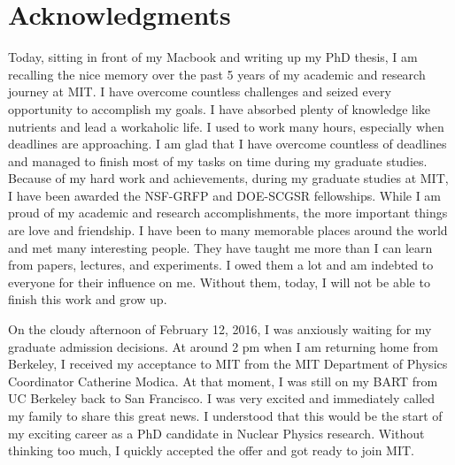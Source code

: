 \cleardoublepage
\setcounter{savepage}{\thepage}
\begin{abstractpage}

\end{abstractpage}

% 

\cleardoublepage

\section*{Acknowledgments}


Today, sitting in front of my Macbook and writing up my PhD thesis, I am recalling the nice memory over the past 5 years of my academic and research journey at MIT. I have overcome countless challenges and seized every opportunity to accomplish my goals. I have absorbed plenty of knowledge like nutrients and lead a workaholic life. I used to work many hours, especially when deadlines are approaching. I am glad that I have overcome countless of deadlines and managed to finish most of my tasks on time during my graduate studies. Because of my hard work and achievements, during my graduate studies at MIT, I have been awarded the NSF-GRFP and DOE-SCGSR fellowships. While I am proud of my academic and research accomplishments, the more important things are love and friendship. I have been to many memorable places around the world and met many interesting people. They have taught me more than I can learn from papers, lectures, and experiments. I owed them a lot and am indebted to everyone for their influence on me. Without them, today, I will not be able to finish this work and grow up.

On the cloudy afternoon of February 12, 2016, I was anxiously waiting for my graduate admission decisions. At around 2 pm when I am returning home from Berkeley, I received my acceptance to MIT from the MIT Department of Physics Coordinator Catherine Modica. At that moment, I was still on my BART from UC Berkeley back to San Francisco. I was very excited and immediately called my family to share this great news. I understood that this would be the start of my exciting career as a PhD candidate in Nuclear Physics research. Without thinking too much, I quickly accepted the offer and got ready to join MIT.

